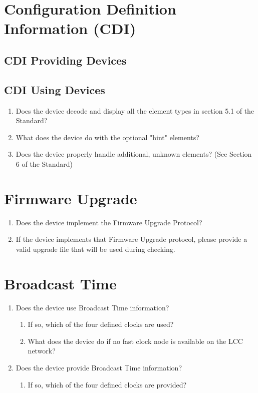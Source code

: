 \section{Configuration Definition Information (CDI)}
    \subsection{CDI Providing Devices}
    \subsection{CDI Using Devices}
        \begin{enumerate}
            \item Does the device decode and display all the element types in section 
                    5.1 of the Standard? 
            \item What does the device do with the optional "hint" elements?
            \item Does the device properly handle additional, unknown elements? 
                    (See Section 6 of the Standard)
        \end{enumerate}

\section{Firmware Upgrade}
    \begin{enumerate}
        \item Does the device implement the Firmware Upgrade Protocol?
        \item If the device implements that Firmware Upgrade protocol,
                please provide a valid upgrade file that will be used
                during checking.
    \end{enumerate}

\section{Broadcast Time}
    \begin{enumerate}
        \item Does the device use Broadcast Time information?
            \begin{enumerate}
                \item If so, which of the four defined clocks are used?
                \item What does the device do if no fast clock node is available
                    on the LCC network?
            \end{enumerate}
        \item Does the device provide Broadcast Time information?
            \begin{enumerate}
                \item If so, which of the four defined clocks are provided?
            \end{enumerate}
        
    \end{enumerate}


